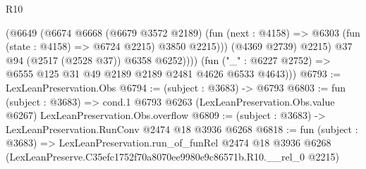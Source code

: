 \begin{lexlean}{R10}
\begin{coremodule}
                  (@6649
                    (@6674
                      @6668
                      (@6679 @3572 @2189)
                      (fun (next : @4158) =>
                      @6303 (fun (state : @4158) => @6724 @2215) @3850 @2215)))
                  (@4369 @2739)
                  @2215)
                @37
                @94
                (@2517 (@2528 @37))
                @6358
                @6252))))
        (fun ("_" : @6227 @2752) => @6555 @125 @31 @49 @2189 @2189 @2481 @4626 @6533 @4643)))
@6793 := LexLeanPreservation.Obs
@6794 := (subject : @3683) -> @6793
@6803 := fun (subject : @3683) =>
  cond.{1} @6793 @6263 (LexLeanPreservation.Obs.value @6267) LexLeanPreservation.Obs.overflow
@6809 := (subject : @3683) -> LexLeanPreservation.RunConv @2474 @18 @3936 @6268
@6818 := fun (subject : @3683) =>
  LexLeanPreservation.run_of_funRel
    @2474
    @18
    @3936
    @6268
    (LexLeanPreserve.C35efc1752f70a8070ee9980e9c86571b.R10.__rel_0 @2215)
\end{coremodule}
\end{lexlean}
